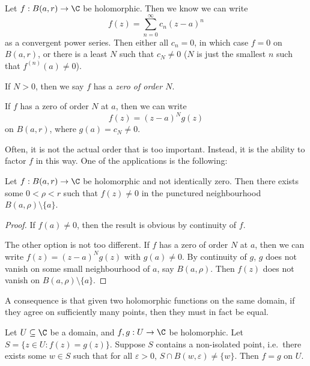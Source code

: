 \documentclass[a4paper]{article}
\begin{document}
\begin{defi}
  Let $f: B(a, r) \to \C$ be holomorphic. Then we know we can write
  \[
    f(z) = \sum_{n = 0}^\infty c_n (z - a)^n
  \]
  as a convergent power series. Then either all $c_n = 0$, in which case $f = 0$ on $B(a, r)$, or there is a least $N$ such that $c_N \not =0$ ($N$ is just the smallest $n$ such that $f^{(n)} (a) \not= 0$).

  If $N > 0$, then we say $f$ has a \emph{zero of order $N$}.
\end{defi}
If $f$ has a zero of order $N$ at $a$, then we can write
\[
  f(z) = (z - a)^N g(z)
\]
on $B(a, r)$, where $g(a) = c_N \not= 0$.

Often, it is not the actual order that is too important. Instead, it is the ability to factor $f$ in this way. One of the applications is the following:
\begin{lemma}
  Let $f: B(a, r) \to \C$ be holomorphic and not identically zero. Then there exists some $0 < \rho < r$ such that $f(z) \not= 0$ in the punctured neighbourhood $B(a, \rho) \setminus \{a\}$.
\end{lemma}

\begin{proof}
  If $f(a) \not= 0$, then the result is obvious by continuity of $f$.

  The other option is not too different. If $f$ has a zero of order $N$ at $a$, then we can write $f(z) = (z - a)^N g(z)$ with $g(a) \not= 0$. By continuity of $g$, $g$ does not vanish on some small neighbourhood of $a$, say $B(a, \rho)$. Then $f(z)$ does not vanish on $B(a, \rho) \setminus \{a\}$.
\end{proof}

A consequence is that given two holomorphic functions on the same domain, if they agree on sufficiently many points, then they must in fact be equal.
\begin{cor}
  Let $U \subseteq \C$ be a domain, and $f, g: U \to \C$ be holomorphic. Let $S = \{z \in U: f(z) = g(z)\}$. Suppose $S$ contains a non-isolated point, i.e.\ there exists some $w \in S$ such that for all $\varepsilon > 0$, $S \cap B(w, \varepsilon) \not= \{w\}$. Then $f = g$ on $U$.
\end{cor}
\end{document}
